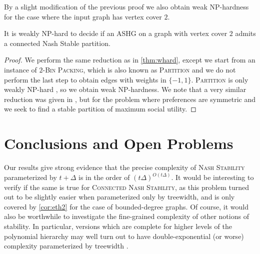 \documentclass[letterpaper,USenglish,cleveref, autoref, thm-restate]{lipics-v2021}
\begin{document}
By a slight modification of the previous proof we also obtain weak NP-hardness
for the case where the input graph has vertex cover $2$. 

\begin{corollary}\label{cor:weak} It is weakly NP-hard to decide if an ASHG on
a graph with vertex cover $2$ admits a connected Nash Stable partition.
\end{corollary}

\begin{proof}

We perform the same reduction as in \cref{thm:whard}, except we start from an
instance of $2$-\textsc{Bin Packing}, which is also known as \textsc{Partition}
and we do not perform the last step to obtain edges with weights in $\{-1,1\}$.
\textsc{Partition} is only weakly NP-hard \cite{GareyJ79}, so we obtain weak
NP-hardness. We note that a very similar reduction was given in
\cite{HanakaKMO19}, but for the problem where preferences are symmetric and we
seek to find a stable partition of maximum social utility.  \end{proof}


\section{Conclusions and Open Problems}

Our results give strong evidence that the precise complexity of \textsc{Nash
Stability} parameterized by $t+\Delta$ is in the order of
$(t\Delta)^{O(t\Delta)}$. It would be interesting to verify if the same is true
for \textsc{Connected Nash Stability}, as this problem turned out to be
slightly easier when parameterized only by treewidth, and is only covered by
\cref{cor:eth2} for the case of bounded-degree graphs. Of course, it would also
be worthwhile to investigate the fine-grained complexity of other notions of
stability. In particular, versions which are complete for higher levels of the
polynomial hierarchy \cite{Peters17} may well turn out to have
double-exponential (or worse) complexity parameterized by treewidth
\cite{LampisMM18,LampisM17}.
























\end{document}

